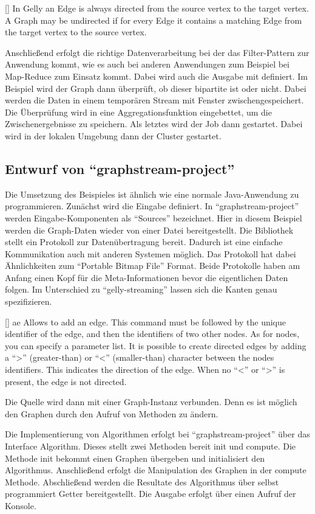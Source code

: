 [\cite{Foundation2018}]{
In Gelly an Edge is always directed from the source vertex to the target vertex.
A Graph may be undirected if for every Edge it contains a matching Edge from the
target vertex to the source vertex.}

Anschließend erfolgt die richtige Datenverarbeitung bei der das Filter-Pattern
zur Anwendung kommt, wie es auch bei anderen Anwendungen zum Beispiel bei Map-Reduce
zum Einsatz kommt. Dabei wird auch die Ausgabe mit definiert. Im Beispiel wird der
Graph dann überprüft, ob dieser bipartite ist oder nicht. Dabei werden die Daten
in einem temporären Stream mit Fenster zwischengespeichert. Die Überprüfung wird
in eine Aggregationsfunktion eingebettet, um die Zwischenergebnisse zu speichern.
Als letztes wird der Job dann gestartet. Dabei wird in der lokalen Umgebung dann
der Cluster gestartet.

\subsection{Entwurf von \enquote{graphstream-project}}
Die Umsetzung des Beispieles ist ähnlich wie eine normale Java-Anwendung zu
programmieren. Zunächst wird die Eingabe definiert. In \enquote{graphstream-project}
werden Eingabe-Komponenten als \enquote{Sources} bezeichnet. Hier in diesem
Beispiel werden die Graph-Daten wieder von einer Datei bereitgestellt. Die
Bibliothek stellt ein Protokoll zur Datenübertragung bereit. Dadurch ist eine
einfache Kommunikation auch mit anderen Systemen möglich. Das Protokoll hat dabei
Ähnlichkeiten zum \enquote{Portable Bitmap File} Format. Beide Protokolle haben
am Anfang einen Kopf für die Meta-Informationen bevor die eigentlichen Daten
folgen. Im Unterschied zu \enquote{gelly-streaming} lassen sich die Kanten
genau spezifizieren.

[\cite{Team2018}]{
ae Allows to add an edge. This command must be followed by the unique identifier
of the edge, and then the identifiers of two other nodes. As for nodes, you can
specify a parameter list. It is possible to create directed edges by adding a
“>” (greater-than) or “<” (smaller-than) character between the nodes identifiers.
This indicates the direction of the edge. When no “<” or “>” is present, the
edge is not directed.}

Die Quelle wird dann mit einer Graph-Instanz verbunden. Denn es ist möglich
den Graphen durch den Aufruf von Methoden zu ändern.

Die Implementierung von Algorithmen erfolgt bei \enquote{graphstream-project}
über das Interface Algorithm. Dieses stellt zwei Methoden bereit init und compute.
Die Methode init bekommt einen Graphen übergeben und initialisiert den Algorithmus.
Anschließend erfolgt die Manipulation des Graphen in der compute Methode.
Abschließend werden die Resultate des Algorithmus über selbst programmiert
Getter bereitgestellt. Die Ausgabe erfolgt über einen Aufruf der Konsole.

